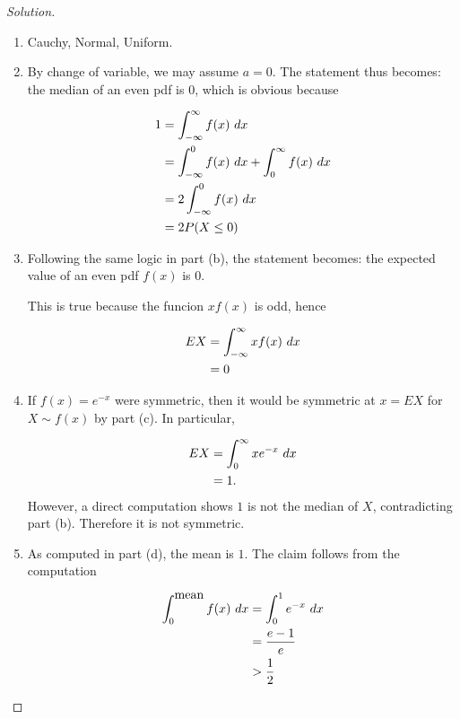 \documentclass[12pt,letterpaper,reqno]{amsart}
\numberwithin{equation}{subsection}
\begin{document}
\begin{proof}[Solution]~\\
\begin{enumerate}[label=(\alph*),leftmargin=*]
    \item Cauchy, Normal, Uniform.
    
    \item By change of variable, we may assume $a = 0$. The statement thus becomes: the median of an even pdf is 0, which is obvious because
    
    \begin{align*}
         1 &= \myint{f(x)}{x}{-\infty}{\infty} \\
         &= \myint{f(x)}{x}{-\infty}{0} + \myint{f(x)}{x}{0}{\infty} \\
         &= 2 \myint{f(x)}{x}{-\infty}{0} \\
         &= 2 \fun{P}{X \leq 0}
    \end{align*}
    
    \item Following the same logic in part (b), the statement becomes: the expected value of an even pdf $f(x)$ is 0.
    
    This is true because the funcion $xf(x)$ is odd, hence
    
    \begin{align*}
        EX &= \myint{xf(x)}{x}{-\infty}{\infty} \\
           &= 0
    \end{align*}
    
    \item If $f(x) = e^{-x}$ were symmetric, then it would be symmetric at $x = EX$ for $X \sim f(x)$ by part (c). In particular,
    
    \begin{align*}
        EX &= \myint{xe^{-x}}{x}{0}{\infty} \\
           &= 1.
    \end{align*}
    However, a direct computation shows $1$ is not the median of $X$, contradicting part (b). Therefore it is not symmetric.
    
    \item As computed in part (d), the mean is $1$. The claim follows from the computation
    
    \begin{align*}
        \myint{f(x)}{x}{0}{\mbox{mean}} &= \myint{e^{-x}}{x}{0}{1} \\
                                        &= \frac{e-1}{e} \\
                                        &> \frac{1}{2}
    \end{align*}
\end{enumerate}
\end{proof}
\end{document}
